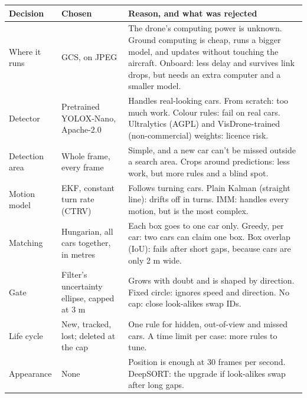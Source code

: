 \documentclass[11pt]{article}
\begin{document}
\begin{table}[H]
\centering
\small
\begin{tabular}{|>{\raggedright\arraybackslash}p{3cm}|%
  >{\raggedright\arraybackslash}p{4.6cm}|%
  >{\raggedright\arraybackslash}p{8.6cm}|}
  \hline
  \rowcolor{headcolor}
  Decision & Chosen & Reason, and what was rejected \\
  \hline
  Where it runs & GCS, on JPEG & The drone's computing power is unknown.
    Ground computing is cheap, runs a bigger model, and updates without touching
    the aircraft. Onboard: less delay and survives link drops, but needs an
    extra computer and a smaller model. \\
  Detector & Pretrained YOLOX-Nano, Apache-2.0 & Handles real-looking cars.
    From scratch: too much work. Colour rules: fail on real cars. Ultralytics
    (AGPL) and VisDrone-trained (non-commercial) weights: licence risk. \\
  Detection area & Whole frame, every frame & Simple, and a new car can't be
    missed outside a search area. Crops around predictions: less work, but more
    rules and a blind spot. \\
  Motion model & EKF, constant turn rate (CTRV) & Follows turning cars. Plain
    Kalman (straight line): drifts off in turns. IMM: handles every motion, but
    is the most complex. \\
  Matching & Hungarian, all cars together, in metres & Each box goes to one
    car only. Greedy, per car: two cars can claim one box. Box overlap (IoU):
    fails after short gaps, because cars are only 2 m wide. \\
  Gate & Filter's uncertainty ellipse, capped at 3 m & Grows with doubt and is
    shaped by direction. Fixed circle: ignores speed and direction. No cap:
    close look-alikes swap IDs. \\
  Life cycle & New, tracked, lost; deleted at the cap & One rule for hidden,
    out-of-view and missed cars. A time limit per case: more rules to tune. \\
  Appearance & None & Position is enough at 30 frames per second. DeepSORT:
    the upgrade if look-alikes swap after long gaps. \\
  \hline
\end{tabular}
\end{table}
\end{document}
